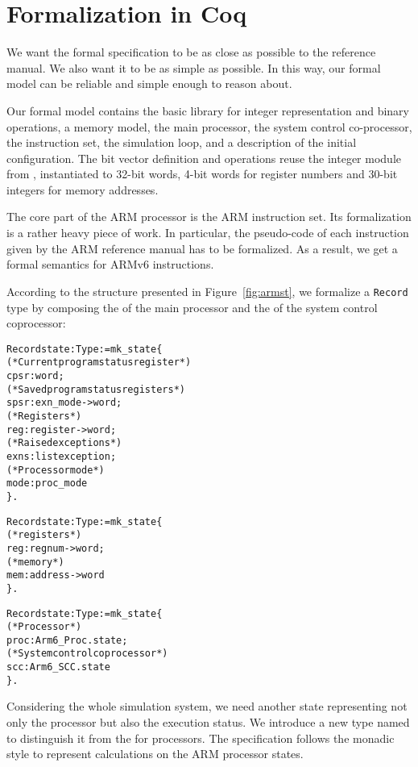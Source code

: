 \section{Formalization in Coq}

\newcommand{\statedef}{\coqcode{state}}

We want the formal specification to be as close as possible to the
reference manual.  We also want it to be as simple as possible.  In
this way, our formal model can be reliable and simple enough to reason
about.

Our formal model contains the basic library for integer representation
and binary operations, a memory model, the main processor, the system
control co-processor, the instruction set, the simulation loop, and a
description of the initial configuration. %
The bit vector definition and operations reuse the integer
module from \compcert,
instantiated to 32-bit words, 4-bit words for register numbers
and 30-bit integers for memory addresses.

The core part of the ARM processor is the ARM instruction set.  Its
formalization is a rather heavy piece of work.  In particular, the
pseudo-code of each instruction given by the ARM reference manual has
to be formalized.  As a result, we get a formal semantics for ARMv6
instructions.

According to the structure presented in Figure~\ref{fig:armst},
we formalize a \texttt{Record} type \statedef by composing
the \statedef of the main processor
and the \statedef of the system control coprocessor:

\begin{alltt}
Record state : Type := mk_state \{
  (* Current program status register *)
  cpsr : word;
  (* Saved program status registers *)
  spsr : exn_mode -> word;
  (* Registers *)
  reg : register -> word;
  (* Raised exceptions *)
  exns : list exception;
  (* Processor mode *)
  mode : proc_mode
\}.

Record state : Type := mk_state \{
  (* registers *)
  reg : regnum -> word;
  (* memory *)
  mem : address -> word
\}.

Record state : Type := mk_state \{
  (* Processor *)
  proc : Arm6_Proc.state;
  (* System control coprocessor *)
  scc : Arm6_SCC.state
\}.
\end{alltt}

Considering the whole simulation system, we need another state
representing not only the processor but also the execution status.
We introduce a new type named  to distinguish it from
the \statedef for processors.
The specification follows the monadic style \cite{wadjfp09}
to represent calculations on the ARM processor states.

